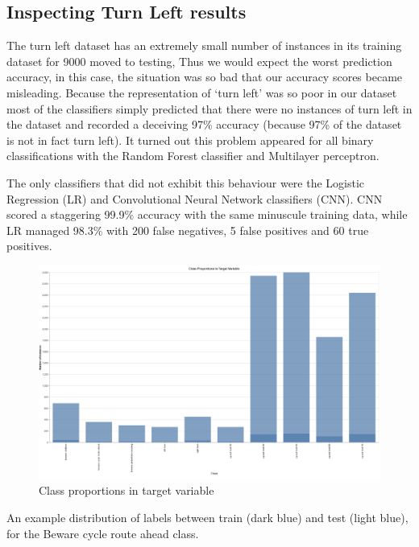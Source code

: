 \documentclass[11pt]{article}
\begin{document}
\subsection{Inspecting Turn Left results}
The turn left dataset has an extremely small number of instances in its training dataset for 9000 moved to testing, Thus we would expect the worst prediction accuracy, in this case, the situation was so bad that our accuracy scores became misleading. Because the representation of ‘turn left’ was so poor in our dataset most of the classifiers simply predicted that there were no instances of turn left in the dataset and recorded a deceiving 97\% accuracy (because 97\% of the dataset is not in fact turn left). It turned out this problem appeared for all binary classifications with the Random Forest classifier and Multilayer perceptron.
\par
The only classifiers that did not exhibit this behaviour were the Logistic Regression (LR) and Convolutional Neural Network classifiers (CNN). CNN scored a staggering 99.9\% accuracy with the same minuscule training data, while LR managed 98.3\% with 200 false negatives, 5 false positives and 60 true positives.
\newline
\par
\begin{figure}[h]
  \caption {Class proportions in target variable}
  \centering 
  \includegraphics[width = \textwidth, height = 0.5\textheight, keepaspectratio]{Images/classProportionsInTargetVariable.png}
\end{figure}
An example distribution of labels between train (dark blue) and test (light blue), for the Beware cycle route ahead class. 

\newpage
\end{document}
